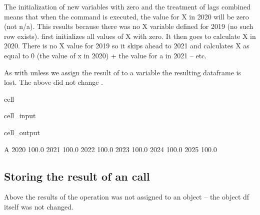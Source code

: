 \documentclass[letterpaper,10pt,english]{jupyterBook}
\begin{document}
\sphinxAtStartPar
The initialization of new variables with zero and the treatment of lags combined means that when the command  is executed, the value for X in 2020 will be zero (not n/a). This results because there was no X variable defined for 2019 (no such row exists).  first initializes all values of X with zero.  It then goes to calculate X in 2020.  There is no X value for 2019 so it skips ahead to 2021 and calculates X as equal to 0 (the value of x in 2020) + the value for a in 2021 – etc.

\sphinxAtStartPar
As with  unless we assign the result of  to a variable the resulting dataframe is lost.  The above did not change .

\begin{sphinxuseclass}{cell}\begin{sphinxVerbatimInput}

\begin{sphinxuseclass}{cell_input}
\begin{sphinxVerbatim}[commandchars=\\\{\}]
\end{sphinxVerbatim}

\end{sphinxuseclass}\end{sphinxVerbatimInput}
\begin{sphinxVerbatimOutput}

\begin{sphinxuseclass}{cell_output}
\begin{sphinxVerbatim}[commandchars=\\\{\}]
          A
2020  100.0
2021  100.0
2022  100.0
2023  100.0
2024  100.0
2025  100.0
\end{sphinxVerbatim}

\end{sphinxuseclass}\end{sphinxVerbatimOutput}

\end{sphinxuseclass}

\subsection{Storing the result of an  call}
\label{\detokenize{content/04_PythonEssentials/mfcalc:storing-the-result-of-an-mfcalc-call}}
\sphinxAtStartPar
Above the results of the  operation was not assigned to an object – the  object df itself was not changed.
\end{document}
